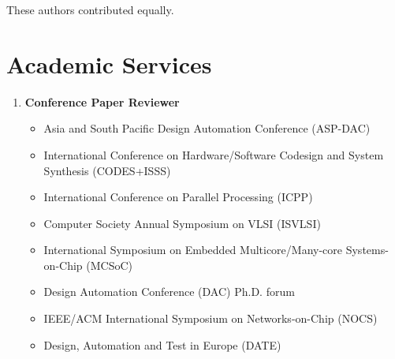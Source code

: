\documentclass{mycv}
\begin{document}
{
	\footnotesize %
	\textsuperscript{\textdagger}These authors contributed equally.
}

\section{Academic Services}

\begin{enumerate}[label={}]
	\item \textbf{Conference Paper Reviewer}
	\begin{itemize}
		\item Asia and South Pacific Design Automation Conference (ASP-DAC)
		\item International Conference on Hardware/Software Codesign and System
		Synthesis (CODES+ISSS)
		\item International Conference on Parallel Processing (ICPP)
		\item Computer Society Annual Symposium on VLSI (ISVLSI)
		\item International Symposium on Embedded Multicore/Many-core Systems-on-Chip (MCSoC)
		\item Design Automation Conference (DAC) Ph.D. forum
		\item IEEE/ACM International Symposium on Networks-on-Chip (NOCS)
		\item Design, Automation and Test in Europe (DATE)

\end{itemize}
\end{enumerate}
\end{document}
